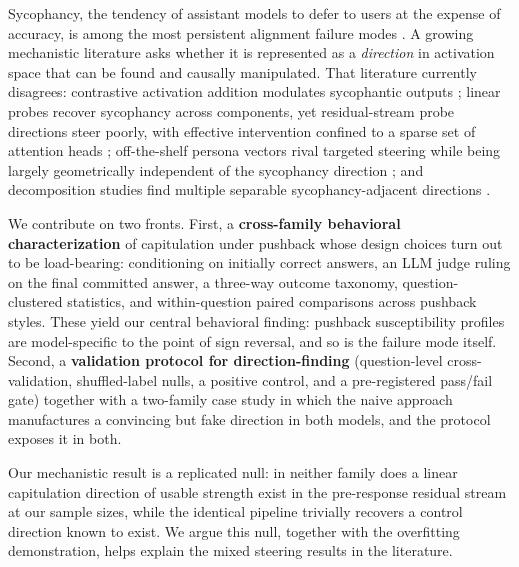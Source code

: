 \documentclass[11pt]{article}
\begin{document}
Sycophancy, the tendency of assistant models to defer to users at the
expense of accuracy, is among the most persistent alignment failure
modes \citep{perez2022discovering,sharma2023sycophancy}. A growing
mechanistic literature asks whether it is represented as a
\emph{direction} in activation space that can be found and causally
manipulated. That literature currently disagrees: contrastive activation
addition modulates sycophantic outputs
\citep{rimsky2024caa,nrimsky2023modulating}; linear probes recover
sycophancy across components, yet residual-stream probe directions
steer poorly, with effective intervention confined to a sparse set of
attention heads \citep{genadi2026probes}; off-the-shelf persona vectors
rival targeted steering while being largely geometrically independent
of the sycophancy direction \citep{devils2026persona,chen2025persona};
and decomposition studies find multiple separable sycophancy-adjacent
directions \citep{vennemeyer2025dissociating,dissociating2026}.

We contribute on two fronts. First, a \textbf{cross-family behavioral
characterization} of capitulation under pushback whose design choices
turn out to be load-bearing: conditioning on initially correct answers,
an LLM judge ruling on the final committed answer, a three-way outcome
taxonomy, question-clustered statistics, and within-question paired
comparisons across pushback styles. These yield our central behavioral
finding: pushback susceptibility profiles are model-specific to the
point of sign reversal, and so is the failure mode itself. Second, a
\textbf{validation protocol for direction-finding} (question-level
cross-validation, shuffled-label nulls, a positive control, and a
pre-registered pass/fail gate) together with a two-family case study in
which the naive approach manufactures a convincing but fake direction
in both models, and the protocol exposes it in both.

Our mechanistic result is a replicated null: in neither family does a
linear capitulation direction of usable strength exist in the
pre-response residual stream at our sample sizes, while the identical
pipeline trivially recovers a control direction known to exist. We
argue this null, together with the overfitting demonstration, helps
explain the mixed steering results in the literature.
\end{document}
